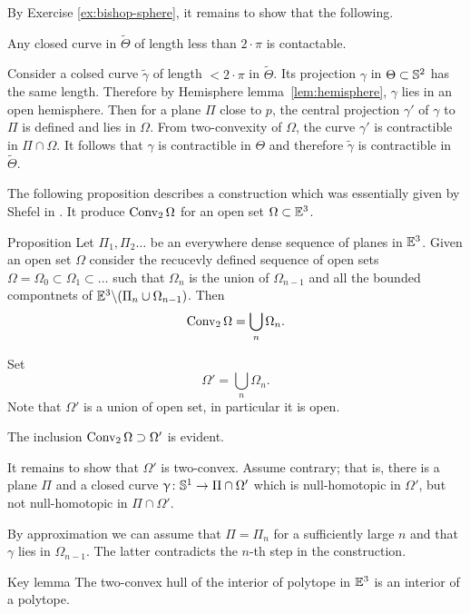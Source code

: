 By Exercise \ref{ex:bishop-sphere}, it remains to show that the following.
\begin{clm}{}
Any closed curve in $\tilde\Theta$ of length less than $2\cdot\pi$ is contactable.
\end{clm}


Consider a colsed curve $\tilde \gamma$ of length $<2\cdot\pi$ in $\tilde\Theta$.
Its projection $\gamma$ in $\Theta\subset\SS^2$ has the same length.
Therefore by Hemisphere lemma~\ref{lem:hemisphere}, $\gamma$ lies in an open hemisphere.
Then for a plane $\Pi$ close to $p$,
the central projection $\gamma'$ of $\gamma$ to $\Pi$ is defined and lies in $\Omega$.
From two-convexity of $\Omega$, the curve $\gamma'$ is contractible in $\Pi\cap \Omega$.
It follows that $\gamma$ is contractible in $\Theta$ 
and therefore $\tilde\gamma$ is contractible in $\tilde\Theta$.
\qeds

The following proposition 
describes a construction which was essentially given by Shefel in \cite{shefel-3D}.
It produce $\mathop{\rm Conv}\nolimits_2 \Omega$ for an open set $\Omega\subset\EE^3$.

\begin{thm}{Proposition}\label{prop:2-conv-construction}
Let $\Pi_1,\Pi_2\dots$ be an everywhere dense
sequence of planes in $\mathbb{E}^3$.
Given an open set $\Omega$ consider 
the recucevly defined sequence of open sets 
$\Omega=\Omega_0\subset\Omega_1\subset\dots$ 
such that 
$\Omega_n$ is the union of $\Omega_{n-1}$ 
and all the bounded compontnets of 
$\EE^3\backslash(\Pi_n\cup \Omega_{n-1})$.
Then 
\[\mathop{\rm Conv}\nolimits_2\Omega=\bigcup_n\Omega_n.\]

\end{thm}

Set 
\[\Omega'=\bigcup_n\Omega_n.\]
Note that $\Omega'$ is a union of open set, in particular it is open.

The inclusion $\Conv_2\Omega\supset\Omega'$
is evident.

It remains to show that $\Omega'$ is two-convex.
Assume contrary; 
that is, there is a plane $\Pi$ 
and a closed curve $\gamma\:\SS^1\to \Pi\cap \Omega'$ 
which is null-homotopic in $\Omega'$,
but not null-homotopic in $\Pi\cap\Omega'$.

By approximation we can assume that $\Pi=\Pi_n$ for a sufficiently large $n$ 
and that $\gamma$ lies in $\Omega_{n-1}$.
The latter contradicts the $n$-th step in the construction. 
\qeds



\begin{thm}{Key lemma}\label{lem:key-shefel}
The two-convex hull of the interior of polytope in $\mathbb{E}^3$
is an interior of a polytope.
\end{thm}

